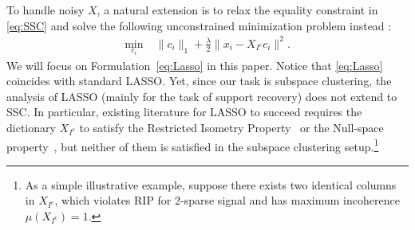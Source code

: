 \documentclass{ctexart}
\begin{document}

To handle noisy $X$, a natural extension is to relax the equality constraint in \eqref{eq:SSC} and solve the following unconstrained minimization problem instead \cite{elhamifar2012ssc_journal}:
\begin{equation}\label{eq:Lasso}
\begin{aligned}
\min_{c_i} \; &\|c_i\|_1+\frac{\lambda}{2}\|x_i-X_{I^c}c_i\|^2.
\end{aligned}
\end{equation}
We will focus on Formulation~\eqref{eq:Lasso} in this paper. Notice that \eqref{eq:Lasso} coincides with standard LASSO. Yet, since our task is subspace clustering, the analysis of LASSO (mainly for the task of support recovery) does not extend to SSC. In particular, existing literature for LASSO to succeed requires the dictionary $X_{I^c}$ to satisfy the Restricted Isometry Property~\cite[RIP for short;][]{candes2008RIP} or the Null-space property~\cite{donoho2006BPDN},  but neither of them is satisfied in the subspace clustering setup.\footnote{As a simple illustrative example, suppose there exists two identical columns in $X_{I^c}$, which violates RIP for 2-sparse signal and has maximum incoherence $\mu(X_{I^c})=1$.}
\end{document}
